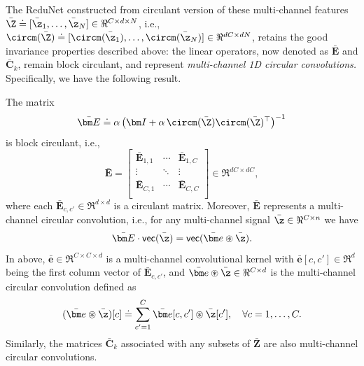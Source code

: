 \documentclass[../../book-main.tex]{subfiles}
\begin{document}
The ReduNet constructed from circulant version of these multi-channel
features $\bar\Z \doteq [\bar \z_1, \ldots, \bar \z_N] \in \Re^{C
\times d \times N}$, i.e., $\circm(\bar\Z) \doteq [ \circm(\bar\z_1),
\dots, \circm(\bar\z_N)] \in \Re^{dC \times dN}$, retains the good
invariance properties described above: the linear operators, now
denoted as $\bar{\bm E}$ and $\bar{\bm C}_k$, remain block circulant,
and represent {\em multi-channel 1D circular convolutions. }
Specifically, we have the following result.
\begin{proposition}
    The matrix
    \begin{equation}
        \label{eq:def-E-bar}
        \bar{\bm E} \doteq \alpha\left(\bm I + \alpha\,
        \circm(\bar\Z) \circm(\bar\Z)^\top \right) ^{-1}
    \end{equation}
    is block circulant, i.e.,
    \begin{equation}
        \bar{\bm E} =
        \left[
            \begin{matrix}
                \bar{\bm E}_{1, 1} & \cdots & \bar{\bm E}_{1, C}\\
                \vdots & \ddots & \vdots \\
                \bar{\bm E}_{C, 1} & \cdots & \bar{\bm E}_{C, C}\\
        \end{matrix}\right] \in \Re^{dC \times dC},
    \end{equation}
    where each $\bar{\bm E}_{c, c'}\in \Re^{d \times d}$ is a
    circulant matrix. Moreover, $\bar{\bm E}$ represents a
    multi-channel circular convolution, i.e., for any multi-channel
    signal $\bar\z \in \Re^{C \times n}$ we have
    \begin{equation}
        \bar{\bm E} \cdot \textsf{vec}(\bar\z) = \textsf{vec}( \bar{\bm
        e} \circledast \bar\z).
    \end{equation}
    In above, $\bar{\bm e} \in \Re^{C \times C \times d}$ is a
    multi-channel convolutional kernel with $\bar{\bm e}[c, c'] \in
    \Re^{d}$ being the first column vector of $\bar{\bm E}_{c, c'}$,
    and $\bar{\bm e} \circledast \bar\z \in \Re^{C \times d}$ is the
    multi-channel circular convolution defined as
    \begin{equation}
        (\bar{\bm e} \circledast \bar\z)[c] \doteq \sum_{c'=1}^C
        \bar{\bm e}[c, c'] \circledast \bar{\z}[c'], \quad \forall c
        = 1, \ldots, C.
    \end{equation}
    Similarly, the matrices $\bar{\bm C}_k$ associated with any
    subsets of $\bar{\bm Z}$ are also multi-channel circular convolutions.
    \label{prop:multichannel-circular-conv-1}
\end{proposition}
\end{document}
